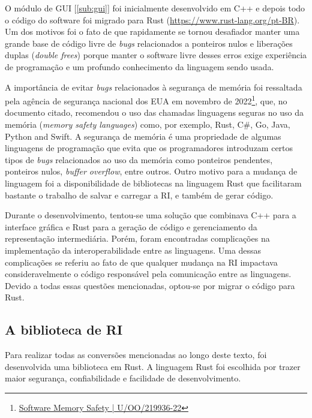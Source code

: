 \documentclass[
	12pt,				%
	openright,			%
	oneside,			%
	a4paper,			%
	main=brazil,
	english,			%
	]{ufsj-abntex2}
\begin{document}
O módulo de GUI [\ref{sub:gui}] foi inicialmente desenvolvido em C++ e depois todo o código do software foi migrado para Rust (\url{https://www.rust-lang.org/pt-BR}). Um dos motivos foi o fato de que rapidamente se tornou desafiador manter uma grande base de código livre de \textit{bugs} relacionados a ponteiros nulos e liberações duplas (\textit{double frees}) porque manter o software livre desses erros exige experiência de programação e um profundo conhecimento da linguagem sendo usada. 

A importância de evitar \textit{bugs} relacionados à segurança de memória foi ressaltada pela agência de segurança nacional dos EUA em novembro de 2022\footnote{\href{https://media.defense.gov/2022/Nov/10/2003112742/-1/-1/0/CSI_SOFTWARE_MEMORY_SAFETY.PDF}{Software Memory Safety | U/OO/219936-22}}, que, no documento citado, recomendou o uso das chamadas linguagens seguras no uso da memória (\textit{memory safety languages}) como, por exemplo, Rust, C\#, Go, Java, Python and Swift. A segurança de memória é uma propriedade de algumas linguagens de programação que evita que os programadores introduzam certos tipos de \textit{bugs} relacionados ao uso da memória como ponteiros pendentes, ponteiros nulos, \textit{buffer overflow}, entre outros. Outro motivo para a mudança de linguagem foi a disponibilidade de bibliotecas na linguagem Rust que facilitaram bastante o trabalho de salvar e carregar a RI, e também de gerar código. 

Durante o desenvolvimento, tentou-se uma solução que combinava C++ para a interface gráfica e Rust para a geração de código e gerenciamento da representação intermediária. Porém, foram encontradas complicações na implementação da interoperabilidade entre as linguagens. Uma dessas complicações se referiu ao fato de que qualquer mudança na RI impactava consideravelmente o código responsável pela comunicação entre as linguagens. Devido a todas essas questões mencionadas, optou-se por migrar o código para Rust. 


\subsection{A biblioteca de RI}
\label{sub:ri}

Para realizar todas as conversões mencionadas ao longo deste texto, foi desenvolvida uma biblioteca em Rust. A linguagem Rust foi escolhida por trazer maior segurança, confiabilidade e facilidade de desenvolvimento. 

\end{document}
